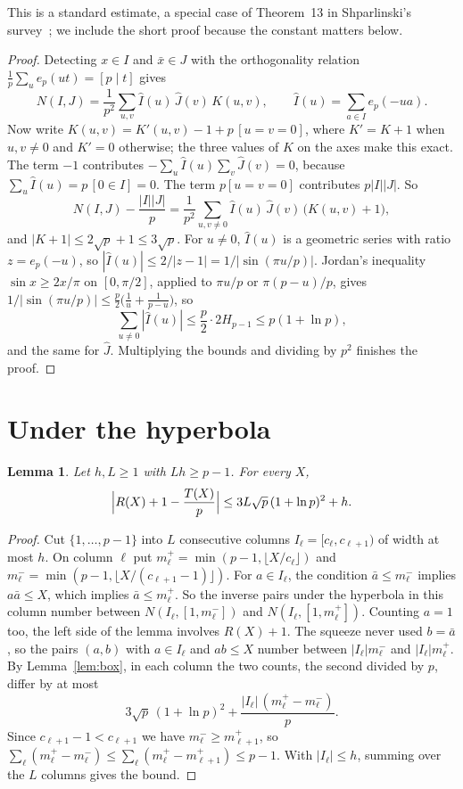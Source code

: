 \documentclass[11pt]{amsart}
\newtheorem{lemma}[theorem]{Lemma}
\theoremstyle{remark}
\begin{document}
This is a standard estimate, a special case of Theorem~13 in Shparlinski's survey~\cite{Shp}; we include the short proof because the constant matters below.

\begin{proof}
Detecting $x\in I$ and $\bar x\in J$ with the orthogonality relation $\frac1p\sum_ue_p(ut)=[p\mid t]$ gives
\[
N(I,J)=\frac1{p^2}\sum_{u,v}\hat I(u)\,\hat J(v)\,K(u,v),\qquad \hat I(u)=\sum_{a\in I}e_p(-ua).
\]
Now write $K(u,v)=K'(u,v)-1+p\,[u=v=0]$, where $K'=K+1$ when $u,v\ne0$ and $K'=0$ otherwise; the three values of $K$ on the axes make this exact. The term $-1$ contributes $-\sum_u\hat I(u)\sum_v\hat J(v)=0$, because $\sum_u\hat I(u)=p\,[0\in I]=0$. The term $p[u=v=0]$ contributes $p|I||J|$. So
\[
N(I,J)-\frac{|I||J|}p=\frac1{p^2}\sum_{u,v\ne0}\hat I(u)\,\hat J(v)\,\bigl(K(u,v)+1\bigr),
\]
and $|K+1|\le2\sqrt p+1\le3\sqrt p$. For $u\ne0$, $\hat I(u)$ is a geometric series with ratio $z=e_p(-u)$, so $|\hat I(u)|\le2/|z-1|=1/|\sin(\pi u/p)|$. Jordan's inequality $\sin x\ge2x/\pi$ on $[0,\pi/2]$, applied to $\pi u/p$ or $\pi(p-u)/p$, gives $1/|\sin(\pi u/p)|\le\frac p2\bigl(\frac1u+\frac1{p-u}\bigr)$, so
\[
\sum_{u\ne0}|\hat I(u)|\le\frac p2\cdot2H_{p-1}\le p(1+\ln p),
\]
and the same for $\hat J$. Multiplying the bounds and dividing by $p^2$ finishes the proof.
\end{proof}

\section{Under the hyperbola}

\begin{lemma}\label{lem:stair}
Let $h,L\ge1$ with $Lh\ge p-1$. For every $X$,
\[
\Bigl|R(X)+1-\frac{T(X)}p\Bigr|\le3L\sqrt p\,(1+\ln p)^2+h .
\]
\end{lemma}

\begin{proof}
Cut $\{1,\dots,p-1\}$ into $L$ consecutive columns $I_\ell=[c_\ell,c_{\ell+1})$ of width at most $h$. On column $\ell$ put $m^+_\ell=\min(p-1,\lfloor X/c_\ell\rfloor)$ and $m^-_\ell=\min(p-1,\lfloor X/(c_{\ell+1}-1)\rfloor)$. For $a\in I_\ell$, the condition $\bar a\le m^-_\ell$ implies $a\bar a\le X$, which implies $\bar a\le m^+_\ell$. So the inverse pairs under the hyperbola in this column number between $N(I_\ell,[1,m^-_\ell])$ and $N(I_\ell,[1,m^+_\ell])$. Counting $a=1$ too, the left side of the lemma involves $R(X)+1$. The squeeze never used $b=\bar a$, so the pairs $(a,b)$ with $a\in I_\ell$ and $ab\le X$ number between $|I_\ell|m^-_\ell$ and $|I_\ell|m^+_\ell$. By Lemma~\ref{lem:box}, in each column the two counts, the second divided by $p$, differ by at most
\[
3\sqrt p\,(1+\ln p)^2+\frac{|I_\ell|\,(m^+_\ell-m^-_\ell)}p .
\]
Since $c_{\ell+1}-1<c_{\ell+1}$ we have $m^-_\ell\ge m^+_{\ell+1}$, so $\sum_\ell(m^+_\ell-m^-_\ell)\le\sum_\ell(m^+_\ell-m^+_{\ell+1})\le p-1$. With $|I_\ell|\le h$, summing over the $L$ columns gives the bound.
\end{proof}
\end{document}
